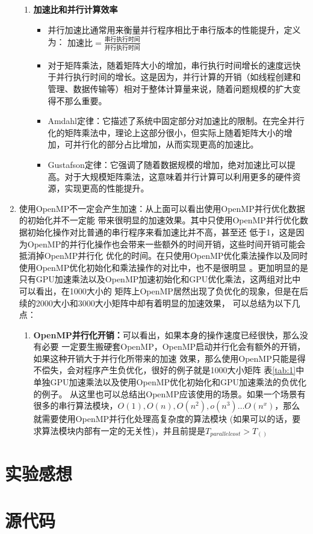 \documentclass{article}
\begin{document}
\begin{enumerate}
\begin{enumerate}
        \item \textbf{加速比和并行计算效率}
        \begin{itemize}
          \item 并行加速比通常用来衡量并行程序相比于串行版本的性能提升，定义为：
          $ 加速比 = \frac{串行执行时间}{并行执行时间} $
          \item 对于矩阵乘法，随着矩阵大小的增加，串行执行时间增长的速度远快于并行执行时间的增长。这是因为，并行计算的开销（如线程创建和管理、数据传输等）相对于整体计算量来说，随着问题规模的扩大变得不那么重要。
          \item Amdahl定律：它描述了系统中固定部分对加速比的限制。在完全并行化的矩阵乘法中，理论上这部分很小，但实际上随着矩阵大小的增加，可并行化的部分占比增加，从而实现更高的加速比。
          \item Gustafson定律：它强调了随着数据规模的增加，绝对加速比可以提高。对于大规模矩阵乘法，这意味着并行计算可以利用更多的硬件资源，实现更高的性能提升。
        \end{itemize}
      \end{enumerate}
      \item 使用OpenMP不一定会产生加速：从上面可以看出使用OpenMP并行优化数据的初始化并不一定能
      带来很明显的加速效果。其中只使用OpenMP并行优化数据初始化操作对比普通的串行程序来看加速比并不高，甚至还
      低于1，这是因为OpenMP的并行化操作也会带来一些额外的时间开销，这些时间开销可能会抵消掉OpenMP并行化
      优化的时间。在只使用OpenMP优化乘法操作以及同时使用OpenMP优化初始化和乘法操作的对比中，也不是很明显
      。更加明显的是只有GPU加速乘法以及OpenMP加速初始化和GPU优化乘法，这两组对比中可以看出，在1000大小的
      矩阵上OpenMP居然出现了负优化的现象，但是在后续的2000大小和3000大小矩阵中却有着明显的加速效果，
      可以总结为以下几点：
      \begin{enumerate}
        \item \textbf{OpenMP并行化开销：}可以看出，如果本身的操作速度已经很快，那么没有必要
        一定要生搬硬套OpenMP，OpenMP启动并行化会有额外的开销，如果这种开销大于并行化所带来的加速
        效果，那么使用OpenMP只能是得不偿失，会对程序产生负优化，很好的例子就是1000大小矩阵
        表\ref{tab:1}中单独GPU加速乘法以及使用OpenMP优化初始化和GPU加速乘法的负优化的例子。
        从这里也可以总结出OpenMP应该使用的场景。如果一个场景有很多的串行算法模块，$O(1),O(n)
        ,O(n^2),o(n^3) \dots O(n^x)$，那么就需要使用OpenMP并行化处理高复杂度的算法模块
        (如果可以的话，要求算法模块内部有一定的无关性)，并且前提是$T_{parallel cost}>T_()$
      \end{enumerate}
\end{enumerate}

\section{实验感想}

\newpage
\appendix
\section{源代码}
\end{document}

